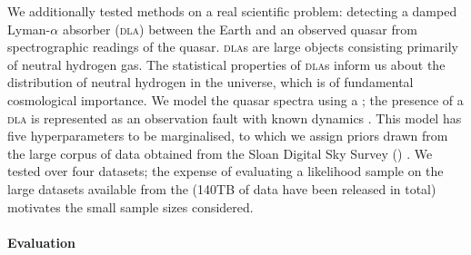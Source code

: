 \documentclass{article} %
\begin{document}
We additionally tested methods on a real scientific problem: detecting a damped Lyman-$\alpha$ absorber (\textsc{dla}) between the Earth and
an observed quasar from spectrographic readings of the quasar.
\textsc{dla}s are large objects consisting primarily
of neutral hydrogen gas.  
The statistical properties of \textsc{dla}s inform us about the distribution of neutral hydrogen in the
universe, which is of fundamental cosmological importance. We model the quasar spectra using a \gp; the presence
of a \textsc{dla} is represented as an observation fault with known dynamics \citep{garnett2010sequential}. This model has five hyperparameters to be marginalised, to which we assign priors drawn from the large corpus of data obtained from the Sloan Digital Sky Survey () \citep{sdss}. We tested over four datasets; the expense of evaluating a \gpb likelihood sample on the large datasets available from the  (140TB of data have been released in total) motivates the small sample sizes considered.




\paragraph{Evaluation}

% 
% 
% 
% 
\end{document}
